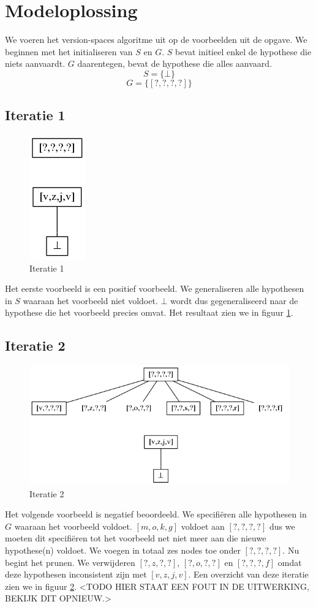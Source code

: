 \documentclass[alternative-exam.tex]{subfiles}
\begin{document}
\section{Modeloplossing}
We voeren het version-spaces algoritme uit op de voorbeelden uit de opgave. We beginnen met het initialiseren van $S$ en $G$. $S$ bevat initieel enkel de hypothese die niets aanvaardt. $G$ daarentegen, bevat de hypothese die alles aanvaard.
\[
S = \{\bot\}
\]
\[
G = \{[?,?,?,?]\}
\]
\subsection{Iteratie 1}
\begin{figure}
[H]
\centering
\caption{Iteratie 1}
\label{iter_1}
\includegraphics[scale=0.5]{resources/graphs/iteration_1.png}
\end{figure}
Het eerste voorbeeld is een positief voorbeeld. We generaliseren alle hypothesen in $S$ waaraan het voorbeeld niet voldoet. $\bot$ wordt dus gegeneraliseerd naar de hypothese die het voorbeeld precies omvat. Het resultaat zien we in figuur \ref{iter_1}.

\subsection{Iteratie 2}
\begin{figure}
[H]
\centering
\caption{Iteratie 2}
\label{iter_2}
\includegraphics[scale=0.5]{resources/graphs/iteration_2.png}
\end{figure}
Het volgende voorbeeld is negatief beoordeeld. We specifi\"eren alle hypothesen in $G$ waaraan het voorbeeld voldoet. $[m,o,k,g]$ voldoet aan $[?,?,?,?]$ dus we moeten dit specifi\"eren tot het voorbeeld net niet meer aan die nieuwe hypothese(n) voldoet. We voegen in totaal zes nodes toe onder $[?,?,?,?]$. Nu begint het prunen. We verwijderen $[?,z,?,?]$, $[?,o,?,?]$ en $[?,?,?,f]$ omdat deze hypothesen inconsistent zijn met $[v,z,j,v]$. Een overzicht van deze iteratie zien we in figuur \ref{iter_2}.
<TODO HIER STAAT EEN FOUT IN DE UITWERKING, BEKIJK DIT OPNIEUW.>
\end{document}
